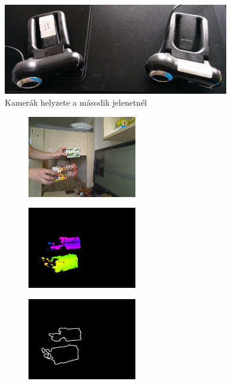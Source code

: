\begin{figure}
\centering
\includegraphics[width=280pt]{figures/scene2_camerapose.jpg}
\caption{Kamerák helyzete a második jelenetnél \label{fig:scene2_camerapose}}
\end{figure}

\begin{figure}[b!]
\centering
\begin{subfigure}[b]{.32\linewidth}
	\centering
	\includegraphics[width=135pt]{figures/scene2/left_45.png}
  \end{subfigure}
\begin{subfigure}[b]{.32\linewidth}
	\centering
	\includegraphics[width=135pt]{figures/scene2/vis_45.png}
  \end{subfigure}
\begin{subfigure}[b]{.32\linewidth}
	\centering
	\includegraphics[width=135pt]{figures/scene2/ctr_45.png}
  \end{subfigure}\\\vspace{5pt}

\end{figure}
